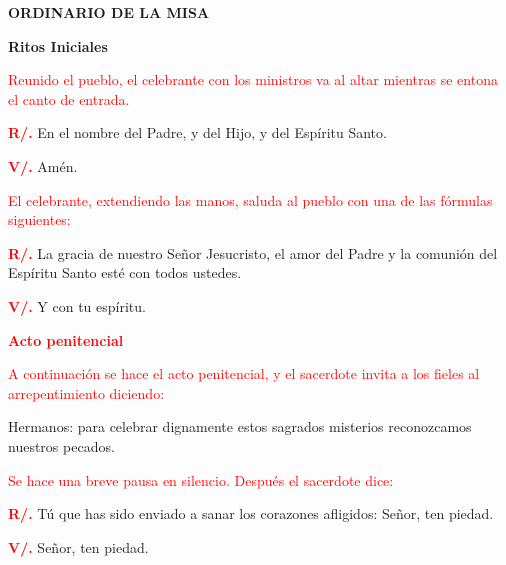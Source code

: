 \documentclass[12pt, letterpaper]{report}
\begin{document}

\begin{center}
\Huge {\bfseries ORDINARIO DE LA MISA}
\end{center}

\begin{center}
\Huge {\bfseries Ritos Iniciales}
\end{center}

\large {\textcolor{red}{Reunido el pueblo, el celebrante con los ministros va al altar mientras se entona el canto de entrada.}}

\noindent
\Large {\bfseries \textcolor{red}{R/.}} \hspace{1cm} {En el nombre del Padre, y del Hijo, y del Esp\'iritu Santo.}

\noindent
\Large{{\bfseries \textcolor{red}{V/.}} \hspace{1cm} Am\'en.}

\large {\textcolor{red}{El celebrante, extendiendo las manos, saluda al pueblo con una de las f\'ormulas siguientes:}}

\noindent
\Large {\bfseries \textcolor{red}{R/.}} \hspace{1cm} La gracia de nuestro Se\~nor Jesucristo, el amor del Padre y la comuni\'on del Esp\'iritu Santo est\'e con todos ustedes.

\noindent
{\bfseries \textcolor{red}{V/.}} \hspace{1cm} \Large Y con tu esp\'iritu.

\large {\bfseries \textcolor{red}{Acto penitencial}}

\large {\textcolor{red}{A continuaci\'on se hace el acto penitencial, y el sacerdote invita a los fieles al arrepentimiento
diciendo:}}

\Large {Hermanos: para celebrar dignamente estos sagrados misterios reconozcamos nuestros pecados.}

\large {\textcolor{red}{Se hace una breve pausa en silencio. Despu\'es el sacerdote dice:}}

\noindent
\Large {\bfseries \textcolor{red}{R/.}} \hspace{1cm} T\'u que has sido enviado a sanar los corazones afligidos: Se\~nor, ten piedad.

\noindent
\Large {\bfseries \textcolor{red}{V/.}} \hspace{1cm} Se\~nor, ten piedad. 
\end{document}
